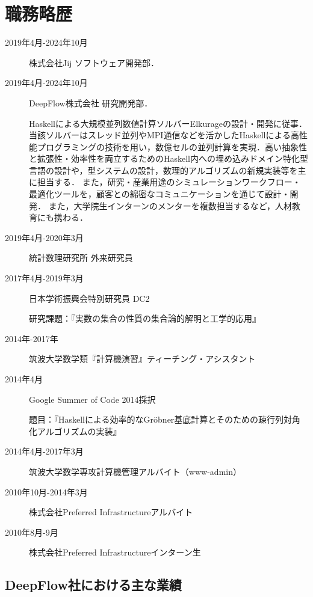 \documentclass[a4j]{ltjsarticle}
\begin{document}
\section*{職務略歴}
\begin{refsection}
  \newrefcontext[labelprefix={J-}] 
\begin{description}
 \item[2019年4月-2024年10月] 株式会社Jij ソフトウェア開発部．
 \item[2019年4月-2024年10月] DeepFlow株式会社 研究開発部．
 
  Haskellによる大規模並列数値計算ソルバーElkurageの設計・開発に従事．当該ソルバーはスレッド並列やMPI通信などを活かしたHaskellによる高性能プログラミングの技術を用い，数億セルの並列計算を実現．高い抽象性と拡張性・効率性を両立するためのHaskell内への埋め込みドメイン特化型言語の設計や，型システムの設計，数理的アルゴリズムの新規実装等を主に担当する．
  また，研究・産業用途のシミュレーションワークフロー・最適化ツールを，顧客との綿密なコミュニケーションを通じて設計・開発．
  また，大学院生インターンのメンターを複数担当するなど，人材教育にも携わる．

 \item[2019年4月-2020年3月] 統計数理研究所 外来研究員
 \item[2017年4月-2019年3月]
              日本学術振興会特別研究員 DC2

              研究課題：『実数の集合の性質の集合論的解明と工学的応用』
 \item[2014年-2017年] 筑波大学数学類『計算機演習』ティーチング・アシスタント
 \item[2014年4月] Google Summer of Code 2014採択

            題目：『Haskellによる効率的なGr\"{o}bner基底計算とそのための疎行列対角化アルゴリズムの実装』
 \item[2014年4月-2017年3月] 筑波大学数学専攻計算機管理アルバイト（www-admin）
 \item[2010年10月-2014年3月] 株式会社Preferred Infrastructureアルバイト
 \item[2010年8月-9月] 株式会社Preferred Infrastructureインターン生
\end{description}

\subsection*{DeepFlow社における主な業績}


\end{refsection}
\end{document}
